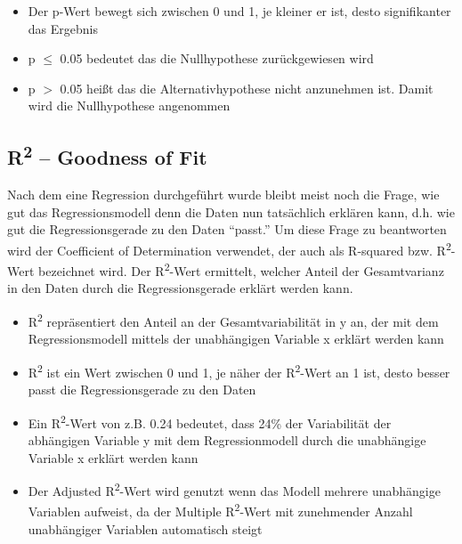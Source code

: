 \documentclass[10pt,a4paper]{article}
\begin{document}
    \begin{itemize}
        \item Der p-Wert bewegt sich zwischen 0 und 1, je kleiner er ist, desto signifikanter das Ergebnis
        \item p $\leq $ 0.05 bedeutet das die Nullhypothese zurückgewiesen wird
        \item p $ > $ 0.05 heißt das die Alternativhypothese nicht anzunehmen ist. Damit wird die Nullhypothese angenommen 
    \end{itemize}

    \subsection{R\textsuperscript{2} -- Goodness of Fit}
    Nach dem eine Regression durchgeführt wurde bleibt meist noch die Frage, wie gut das Regressionsmodell denn die Daten nun tatsächlich erklären kann, d.h. wie gut die Regressionsgerade zu den
    Daten ``passt.'' Um diese Frage zu beantworten wird der Coefficient of Determination verwendet,
    der auch als R-squared bzw. R\textsuperscript{2}-Wert bezeichnet wird. Der R\textsuperscript{2}-Wert ermittelt, welcher Anteil der Gesamtvarianz in den Daten durch die Regressionsgerade erklärt werden kann.

    \begin{itemize}
        \item R\textsuperscript{2} repräsentiert den Anteil an der Gesamtvariabilität in y an, der mit dem Regressionsmodell mittels der unabhängigen Variable x erklärt werden kann
        \item R\textsuperscript{2} ist ein Wert zwischen 0 und 1, je näher der R\textsuperscript{2}-Wert an 1 ist, desto besser passt die Regressionsgerade zu den Daten
        \item Ein R\textsuperscript{2}-Wert von z.B. 0.24 bedeutet, dass 24\% der Variabilität der abhängigen Variable y mit dem Regressionmodell durch die unabhängige Variable x erklärt werden kann
        \item Der Adjusted R\textsuperscript{2}-Wert wird genutzt wenn das Modell mehrere unabhängige Variablen aufweist, da der Multiple R\textsuperscript{2}-Wert mit zunehmender Anzahl unabhängiger Variablen automatisch steigt
    \end{itemize}
\end{document}
